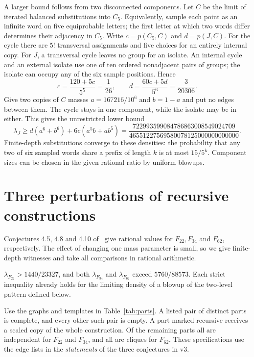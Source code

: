 A larger bound follows from two disconnected components. Let \(C\)
be the limit of iterated balanced substitutions into \(C_5\).
Equivalently, sample each point as an infinite word on five equiprobable
letters; the first letter at which two words differ determines their
adjacency in \(C_5\). Write \(c=p(C_5,C)\) and \(d=p(J,C)\).
For the cycle there are \(5!\) transversal assignments and five choices
for an entirely internal copy. For \(J\), a transversal cycle leaves
no group for an isolate. An internal cycle and an external isolate
use one of ten ordered nonadjacent pairs of groups; the isolate can
occupy any of the six sample positions. Hence
\[
 c=\frac{120+5c}{5^5}=\frac1{26},\qquad
 d=\frac{60c+5d}{5^6}=\frac3{20306}.
\]
Give two copies of \(C\) masses \(a=167216/10^6\) and \(b=1-a\)
and put no edges between them. The cycle stays in one component, while
the isolate may be in either. This gives the unrestricted lower bound
\begin{equation}\label{eq:cycles}
 \lambda_J\ge d(a^6+b^6)+6c(a^5b+ab^5)
 =\frac{722993599084786863008549024709}{46551227569580078125000000000000}.
\end{equation}
Finite-depth substitutions converge to these densities: the probability
that any two of six sampled words share a prefix of length \(k\) is
at most \(15/5^k\). Component sizes can be chosen in the given rational
ratio by uniform blowups.

\section{Three perturbations of recursive constructions}\label{sec:perturb}

Conjectures 4.5, 4.8 and 4.10 of~\cite{six} give rational values
for \(F_{22}, F_{34}\) and \(F_{62}\), respectively. The effect of changing
one mass parameter is small, so we give finite-depth witnesses and
take all comparisons in rational arithmetic.

\begin{theorem}\label{th:perturb}
\(\lambda_{F_{22}}>1440/23327\), and both
\(\lambda_{F_{34}}\) and \(\lambda_{F_{62}}\) exceed \(5760/88573\).
Each strict inequality already holds for the limiting density of a
blowup of the two-level pattern defined below.
\end{theorem}

Use the graphs and templates in Table~\ref{tab:parts}. A listed pair
of distinct parts is complete, and every other such pair is empty.
A part marked recursive receives a scaled copy of the whole construction.
Of the remaining parts all are independent for \(F_{22}\) and \(F_{34}\),
and all are cliques for \(F_{62}\). These specifications use the edge
lists in the \emph{statements} of the three conjectures in v3.

